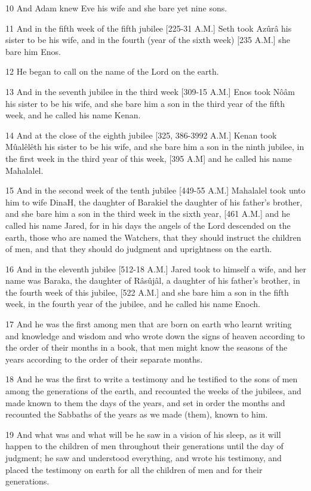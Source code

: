 \par 10 And Adam knew Eve his wife and she bare yet nine sons.
\par 11 And in the fifth week of the fifth jubilee [225-31 A.M.] Seth took Azûrâ his sister to be his wife, and in the fourth (year of the sixth week) [235 A.M.] she bare him Enos.
\par 12 He began to call on the name of the Lord on the earth.
\par 13 And in the seventh jubilee in the third week [309-15 A.M.] Enos took Nôâm his sister to be his wife, and she bare him a son in the third year of the fifth week, and he called his name Kenan.
\par 14 And at the close of the eighth jubilee [325, 386-3992 A.M.] Kenan took Mûalêlêth his sister to be his wife, and she bare him a son in the ninth jubilee, in the first week in the third year of this week, [395 A.M] and he called his name Mahalalel.
\par 15 And in the second week of the tenth jubilee [449-55 A.M.] Mahalalel took unto him to wife DinaH, the daughter of Barakiel the daughter of his father's brother, and she bare him a son in the third week in the sixth year, [461 A.M.] and he called his name Jared, for in his days the angels of the Lord descended on the earth, those who are named the Watchers, that they should instruct the children of men, and that they should do judgment and uprightness on the earth.
\par 16 And in the eleventh jubilee [512-18 A.M.] Jared took to himself a wife, and her name was Baraka, the daughter of Râsûjâl, a daughter of his father's brother, in the fourth week of this jubilee, [522 A.M.] and she bare him a son in the fifth week, in the fourth year of the jubilee, and he called his name Enoch.
\par 17 And he was the first among men that are born on earth who learnt writing and knowledge and wisdom and who wrote down the signs of heaven according to the order of their months in a book, that men might know the seasons of the years according to the order of their separate months.
\par 18 And he was the first to write a testimony and he testified to the sons of men among the generations of the earth, and recounted the weeks of the jubilees, and made known to them the days of the years, and set in order the months and recounted the Sabbaths of the years as we made (them), known to him.
\par 19 And what was and what will be he saw in a vision of his sleep, as it will happen to the children of men throughout their generations until the day of judgment; he saw and understood everything, and wrote his testimony, and placed the testimony on earth for all the children of men and for their generations.
